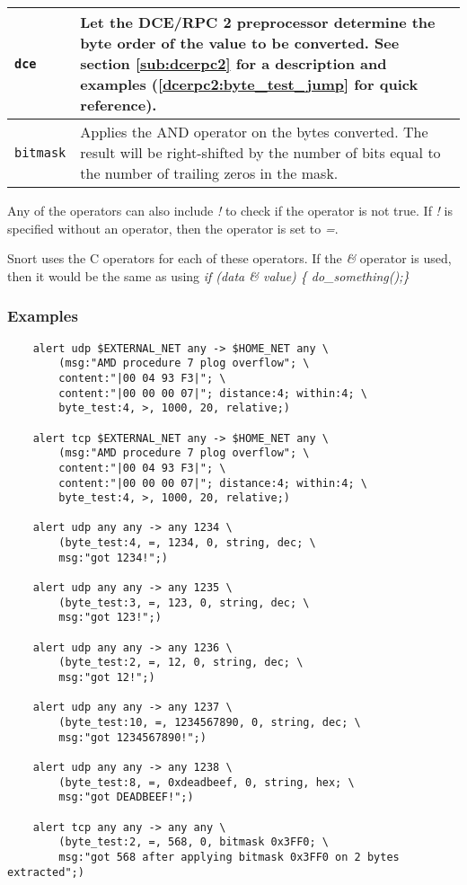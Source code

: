 \documentclass[english]{report}
\newenvironment{note}{
\samepage
    \vspace{10pt}{\textsf{
        {\hspace{7pt}\Huge{$\triangle$\hspace{-12.5pt}{\Large{$^!$}}}}\hspace{5pt}
        {\Large{NOTE}}
    }
    }
   \begin{center}
    \par\vspace{-17pt}

    \begin{lrbox}{\savepar}
    \begin{minipage}[r]{6in}
}
{
    \end{minipage}
    \end{lrbox}
    \fbox{
        \usebox{
            \savepar
	}
    }
    \par\vskip10pt
    \end{center}
}
\newenvironment{note}{
        \begin{rawhtml}
        <p><table border="1"><tr><td><b>
        Note:&nbsp;&nbsp;</b>
        \end{rawhtml}
}{
        \begin{rawhtml}
        </b></td></tr></table></p>
        \end{rawhtml}
}
\begin{document}
\begin{tabular}{| l | p{4.5in} |}
\hline
\texttt{dce} &

Let the DCE/RPC 2 preprocessor determine the byte order of the value to be
converted.  See section \ref{sub:dcerpc2} for a description and examples
(\ref{dcerpc2:byte_test_jump} for quick reference).\\

\hline
\texttt{bitmask} &
Applies the AND operator on the bytes converted. The result will be
right-shifted by the number of bits equal to the number of trailing zeros
in the mask.\\
\hline
\end{tabular}

Any of the operators can also include \emph{!} to check if the operator is not
true.  If \emph{!} is specified without an operator, then the operator is set
to \emph{=}.

\begin{note}

Snort uses the C operators for each of these operators.  If the \emph{\&}
operator is used, then it would be the same as using \emph{if (data \& value)
\{ do\_something();\} }

\end{note}

\subsubsection{Examples}

\begin{verbatim}
    alert udp $EXTERNAL_NET any -> $HOME_NET any \
        (msg:"AMD procedure 7 plog overflow"; \
        content:"|00 04 93 F3|"; \
        content:"|00 00 00 07|"; distance:4; within:4; \
        byte_test:4, >, 1000, 20, relative;)
    
    alert tcp $EXTERNAL_NET any -> $HOME_NET any \
        (msg:"AMD procedure 7 plog overflow"; \
        content:"|00 04 93 F3|"; \
        content:"|00 00 00 07|"; distance:4; within:4; \
        byte_test:4, >, 1000, 20, relative;)
    
    alert udp any any -> any 1234 \
        (byte_test:4, =, 1234, 0, string, dec; \
        msg:"got 1234!";)
    
    alert udp any any -> any 1235 \
        (byte_test:3, =, 123, 0, string, dec; \
        msg:"got 123!";)
    
    alert udp any any -> any 1236 \
        (byte_test:2, =, 12, 0, string, dec; \
        msg:"got 12!";)
    
    alert udp any any -> any 1237 \
        (byte_test:10, =, 1234567890, 0, string, dec; \
        msg:"got 1234567890!";)
 
    alert udp any any -> any 1238 \
        (byte_test:8, =, 0xdeadbeef, 0, string, hex; \
        msg:"got DEADBEEF!";)

    alert tcp any any -> any any \
        (byte_test:2, =, 568, 0, bitmask 0x3FF0; \
        msg:"got 568 after applying bitmask 0x3FF0 on 2 bytes extracted";)
\end{verbatim}
\end{document}
